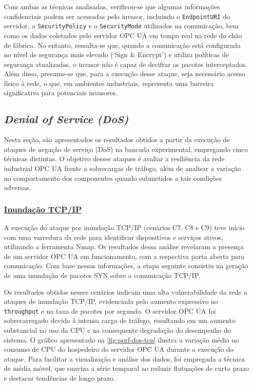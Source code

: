         Com ambas as técnicas analisadas, verificou-se que algumas informações confidenciais podem ser acessadas pelo invasor, incluindo o \texttt{EndpointURI} do servidor, a \texttt{SecurityPolicy} e o \texttt{SecurityMode} utilizados na comunicação, bem como os dados coletados pelo servidor OPC UA em tempo real na rede do chão de fábrica. No entanto, ressalta-se que, quando a comunicação está configurada no nível de segurança mais elevado (`Sign \& Encrypt') e utiliza políticas de segurança atualizadas, o invasor não é capaz de decifrar os pacotes interceptados. Além disso, presume-se que, para a execução desse ataque, seja necessário acesso físico à rede, o que, em ambientes industriais, representa uma barreira significativa para potenciais invasores.

    \subsection{\textit{Denial of Service (DoS)}}

        Nesta seção, são apresentados os resultados obtidos a partir da execução de ataques de negação de serviço (DoS) na bancada experimental, empregando cinco técnicas distintas. O objetivo desses ataques é avaliar a resiliência da rede industrial OPC UA frente a sobrecargas de tráfego, além de analisar a variação no comportamento dos componentes quando submetidos a tais condições adversas.

        \subsubsection*{\underline{Inundação TCP/IP}}
    
            A execução do ataque por inundação TCP/IP (cenários C7, C8 e C9) teve início com uma varredura da rede para identificar dispositivos e serviços ativos, utilizando a ferramenta Nmap. Os resultados dessa análise revelaram a presença de um servidor OPC UA em funcionamento, com a respectiva porta aberta para comunicação. Com base nessas informações, a etapa seguinte consistiu na geração de uma inundação de pacotes SYN sobre a comunicação TCP/IP.
            
            Os resultados obtidos nesses cenários indicam uma alta vulnerabilidade da rede a ataques de inundação TCP/IP, evidenciada pelo aumento expressivo no \texttt{throughput} e na taxa de pacotes por segundo. O servidor OPC UA foi sobrecarregado devido à intensa carga de tráfego, resultando em um aumento substancial no uso da CPU e na consequente degradação do desempenho do sistema. O gráfico apresentado na \autoref{fig:perf-dos-tcp} ilustra a variação média no consumo de CPU do hospedeiro do servidor OPC UA durante a execução do ataque. Para facilitar a visualização e análise dos dados, foi empregada a técnica de média móvel, que suaviza a série temporal ao reduzir flutuações de curto prazo e destacar tendências de longo prazo.

